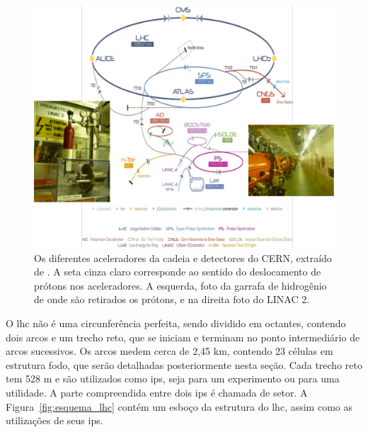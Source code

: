 \begin{figure}[h!t]
\centering
\includegraphics[width=\textwidth]{imagens/lhc_garrafa_linac2.pdf}
\caption[A cadeia de aceleração do LHC]{
Os diferentes aceleradores da cadeia e detectores do CERN, extraído de
\cite{cern_accelerators}. A seta cinza claro corresponde ao sentido do
deslocamento de prótons nos aceleradores. A esquerda, foto da garrafa
de hidrogênio de onde são retirados os prótons, e na direita foto do LINAC 2.}
\label{fig:esquema_aceleradores}
\end{figure}

O \gls{lhc} não é uma circunferência perfeita, sendo dividido em octantes, 
contendo dois arcos e um trecho reto, que se iniciam e terminam no ponto
intermediário de arcos sucessivos. Os arcos medem cerca de 2,45 km,
contendo 23 células em estrutura \gls{fodo}, que serão detalhadas
posteriormente nesta seção. 
Cada trecho reto tem 528 m e são utilizados como \glspl{ip},
seja para um experimento ou para uma utilidade. A parte
compreendida entre dois \glspl{ip} é chamada de setor. A 
Figura~\ref{fig:esquema_lhc} contém um esboço da estrutura do \gls{lhc}, assim
como as utilizações de seus \glspl{ip}.

